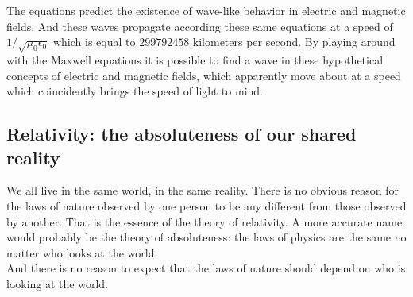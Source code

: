 \begin{center}
\end{center}
\noindent The equations predict the existence of wave-like behavior in electric and magnetic fields. And these waves propagate according these same equations at a speed of $1/\sqrt{\mu_0 \epsilon_0}$ which is equal to $299 792 458$ kilometers per second. By playing around with the Maxwell equations it is possible to find a wave in these hypothetical concepts of electric and magnetic fields, which apparently move about at a speed which coincidently brings the speed of light to mind.

\subsection{Relativity: the absoluteness of our shared reality}
\label{RelativeElectrMagn}
\noindent We all live in the same world, in the same reality. There is no obvious reason for the laws of nature observed by one person to be any different from those observed by another. That is the essence of the theory of relativity. A more accurate name would probably be the theory of absoluteness: the laws of physics are the same no matter who looks at the world.\\

 And there is no reason to expect that the laws of nature should depend on who is looking at the world.

